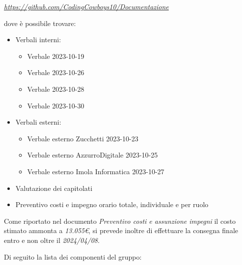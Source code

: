 \documentclass[12pt]{article}
\begin{document}
\begin{center}
\textit{\url{https://github.com/CodingCowboys10/Documentazione}}
\end{center}
\begin{flushleft}
dove è possibile trovare:\\
\begin{itemize}
    \item Verbali interni:
    \begin{itemize}
       \item Verbale 2023-10-19
       \item Verbale 2023-10-26
       \item Verbale 2023-10-28
       \item Verbale 2023-10-30
    \end{itemize}
    \item Verbali esterni:
    \begin{itemize}
       \item Verbale esterno Zucchetti 2023-10-23
       \item Verbale esterno AzzurroDigitale 2023-10-25
       \item Verbale esterno Imola Informatica 2023-10-27
    \end{itemize}
    \item Valutazione dei capitolati
    \item Preventivo costi e impegno orario totale, individuale e per ruolo
\end{itemize}
\newpage
Come riportato nel documento \textit{Preventivo costi e assunzione impegni} il costo stimato ammonta a \textit{13.055€}, si prevede inoltre di effettuare la consegna finale entro e non oltre il \textit{2024/04/08}.\\
\end{flushleft}
\begin{flushleft}
Di seguito la lista dei componenti del gruppo:
\end{flushleft}
\end{document}
